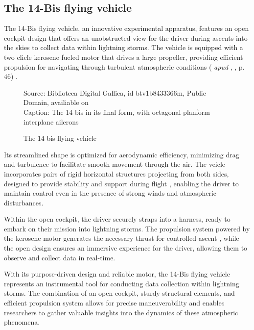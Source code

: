 \documentclass[english]{cenarticle} %
\newcommand{\citeapud}[3]{
  (\citeauthor{#1} {\it apud} \citeauthor{#2}, \citeyear{#2}, p. #3)
}
\begin{document}
\subsection{The 14-Bis flying vehicle}
The 14-Bis flying vehicle, an innovative experimental apparatus, features an open cockpit design that offers an unobstructed view for the driver during ascents into the skies to collect data within lightning storms. The vehicle is equipped with a two clicle kerosene fueled motor \citep{Torrens1992} that drives a large propeller, providing efficient propulsion for navigating through turbulent atmospheric conditions \citeapud{Pimenta1987}{Torrens1992}{46}.\par
%
\begin{figure}[!h]
  \caption{The 14-bis flying vehicle}
  {\footnotesize
   Source: Biblioteca Digital Gallica, id btv1b8433366m, Public Domain, availiable on \citep{Beau1907}\\
   Caption: The 14-bis in its final form, with octagonal-planform interplane ailerons
  }
  \label{fig:flying_veicle}
\end{figure}
%
Its streamlined shape is optimized for aerodynamic efficiency, minimizing drag and turbulence to facilitate smooth movement through the air. The veicle incorporates pairs of rigid horizontal structures projecting from both sides, designed to provide stability and support during flight \citep{Wipo}, enabling the driver to maintain control even in the presence of strong winds and atmospheric disturbances.\par
%
Within the open cockpit, the driver securely straps into a harness, ready to embark on their mission into lightning storms. The propulsion system powered by the kerosene motor generates the necessary thrust for controlled ascent \citep{Torrens1992}, while the open design ensures an immersive experience for the driver, allowing them to observe and collect data in real-time.\par
%
With its purpose-driven design and reliable motor, the 14-Bis flying vehicle represents an instrumental tool for conducting data collection within lightning storms. The combination of an open cockpit, sturdy structural elements, and efficient propulsion system allows for precise maneuverability and enables researchers to gather valuable insights into the dynamics of these atmospheric phenomena.
%
\end{document}
